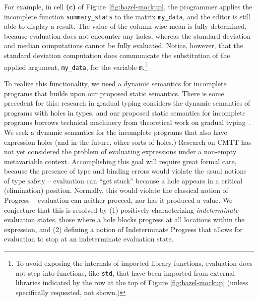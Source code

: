 \documentclass[letterpaper,USenglish]{lipics-v2016}
\let\li\lstinline
\begin{document}
For example, in cell \textbf{(c)} of Figure~\ref{fig:hazel-mockup}, the
programmer applies  the incomplete function \li{summary_stats} to 
the matrix \lstinline{my_data}, and 
the editor is still able to display a result.
The value of the column-wise mean is fully determined, because evaluation does
not encounter any holes, whereas the standard deviation and median computations
cannot be fully evaluated. Notice, however, that the standard
deviation computation does communicate the substitution of the applied argument,
\li{my_data}, for the variable \li{m}.\footnote{To avoid exposing the internals
of imported library functions, evaluation does not step into functions, like
\li{std}, that have been imported from external libraries indicated by the row at the top of Figure \ref{fig:hazel-mockup} (unless specifically
requested, not shown.)}

To realize this functionality, we need a
{dynamic semantics for incomplete programs} that builds upon our proposed
static semantics. There is some precedent for this: research in gradual typing
considers the dynamic semantics of programs with holes in types, and our
proposed static semantics for incomplete programs borrows technical machinery
from theoretical work on gradual typing~\cite{Siek06a}. We seek a dynamic semantics for the
 incomplete programs that also have expression holes (and in the future, other sorts of holes.) Research on CMTT has not yet 
 considered the problem of evaluating expressions under a non-empty metavariable context. Accomplishing this goal will require great formal care, because the presence of type
and binding errors would violate the usual notions of type safety -- evaluation can ``get stuck'' because a hole appears in a critical (elimination) position. Normally, this would violate the classical notion of Progress -- 
evaluation can neither proceed, nor has it produced a value. We conjecture that this is
resolved by (1) positively characterizing \emph{indeterminate} 
evaluation states, those where a hole blocks progress at all locations
within the expression, and (2) defining
a notion of Indeterminate Progress that allows for evaluation to stop at an 
indeterminate evaluation state.

\end{document}
